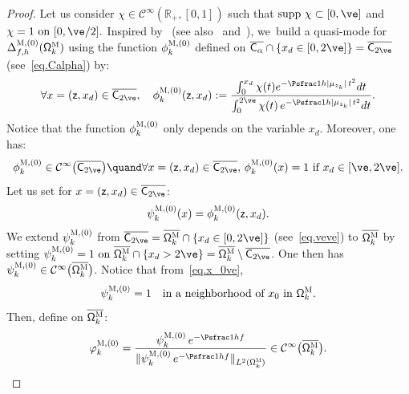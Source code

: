 \begin{proof}
Let us consider $\chi\in\mathcal C^\infty(\mathbb R_+,[0,1])$ such that
$
\text{supp } \chi\subset [0, \ve]$ and $\chi=1 \text{ on } [0,\ve/2].
$
Inspired by~\cite{BEGK} (see also~\cite[\S4.2]{DoNe2} and~\cite{di2017small}), we~build a quasi-mode for $\Delta_{f,h}^{\textsc{M}, (0)}(\mathsf \Omega_k^{\textsc{M}})$ using the function $\phi_k^{\textsc{M},(0)}$ defined on $\overline{ \mathsf C_\alpha} \cap \{x_d \in [0,2\ve]\}= \overline {\mathsf C_{2\ve} }$ (see~\eqref{eq.Calpha}) by:
\begin{equation}\label{eq.phi=def}
\forall x = (\mathsf z,x_d) \in \overline {\mathsf C_{2\ve} }, \quad \phi^{\textsc{M},(0)}_k(\mathsf z,x_d):=\frac{ \int_0^{x_d}\chi(t)e^{-\Psfrac 1h\vert \mu_{z_k}\vert \, t^2} dt}{\int_0^{2\ve}\chi(t)\, e^{-\Psfrac 1h\vert \mu_{z_k}\vert \, t^2} dt}.
\end{equation}
Notice that the function $\phi^{\textsc{M},(0)}_k$ only depends on the variable $x_d$.
Moreover, one has:
\[
\phi^{\textsc{M},(0)}_{k}\in \mathcal C^\infty\bigl(\overline {\mathsf C_{2\ve} }\bigr) \quand 
\forall x = (\mathsf z,x_d) \in \overline {\mathsf C_{2\ve} },\, \phi^{\textsc{M},(0)}_k(x)=1 \text{ if } x_d \in [\ve,2\ve].
\]
Let us set for $x = (\mathsf z,x_d) \in \overline {\mathsf C_{2\ve}
}$:
\begin{equation}\label{eq.defPsi}
\psi^{\textsc{M},(0)}_k(x)= \phi^{\textsc{M},(0)}_k(\mathsf z,x_d).
\end{equation}
We extend $\psi^{\textsc{M},(0)}_k$ from $ \overline {\mathsf C_{2\ve} } =\overline {\mathsf \Omega_k^{\textsc{M}}}\cap \{ x_d \in [0,2\ve]\}$ (see~\eqref{eq.veve}) to $ \overline {\mathsf \Omega_k^{\textsc{M}}}$ by setting
$\psi^{\textsc{M},(0)}_k=1 \text{ on } \overline {\mathsf \Omega_k^{\textsc{M}}}\cap \{ x_d> 2\ve\}= \overline {\mathsf \Omega_k^{\textsc{M}}}\setminus \overline {\mathsf C_{2\ve} }$.
One then has $\psi^{\textsc{M},(0)}_k\in \mathcal C^\infty\bigl(\overline {\mathsf \Omega_k^{\textsc{M}}} \bigr)$.
Notice that from~\eqref{eq.x_0ve},
\begin{equation}\label{eq.psi=1x_0}
\psi^{\textsc{M},(0)}_k= 1 \quad\text{in a neighborhood of $x_0$ in $\mathsf \Omega_k^{\textsc{M}}$}.
\end{equation}
Then, define on $ \overline{\mathsf \Omega_k^{\textsc{M}}}$:
\begin{equation}\label{eq.QM-M0}
\varphi^{\textsc{M},(0)}_k=\frac{\psi^{\textsc{M},(0)}_k\, e^{-\Psfrac 1hf} }{ \Vert \psi^{\textsc{M},(0)}_k\, e^{-\Psfrac 1hf} \Vert_{L^2(\mathsf \Omega_k^{\textsc{M}})} } \in \mathcal C^\infty\bigl(\overline {\mathsf \Omega_k^{\textsc{M}}} \bigr).
\end{equation}


\end{proof}
